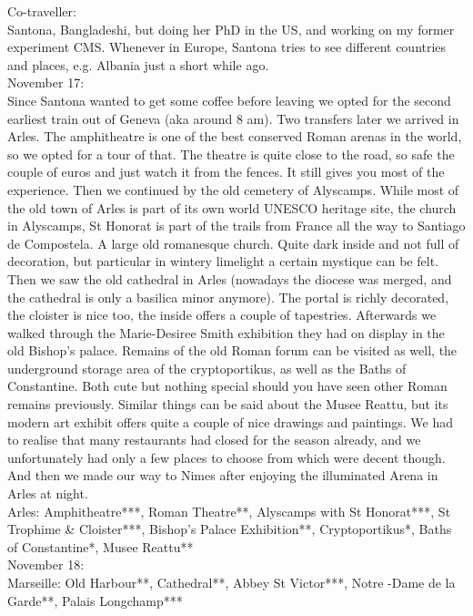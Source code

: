 Co-traveller:\\
Santona, Bangladeshi, but doing her PhD in the US, and working on my former experiment CMS. Whenever in Europe, Santona tries to see different countries and places,  e.g. Albania just a short while ago.\\

November 17:\\
Since Santona wanted to get some coffee before leaving we opted for the second earliest train out of Geneva (aka around 8 am). Two transfers later we arrived in Arles. The amphitheatre is one of the best conserved Roman arenas in the world, so we opted for a tour of that. The theatre is quite close to the road, so safe the couple of euros and just watch it from the fences. It still gives you most of the experience. Then we continued by the old cemetery of Alyscamps. While most of the old town of Arles is part of its own world UNESCO heritage site, the church in Alyscamps, St Honorat is part of the trails from France all the way to Santiago de Compostela. A large old romanesque church. Quite dark inside and not full of decoration, but particular in wintery limelight a certain mystique can be felt. Then we saw the old cathedral in Arles (nowadays the diocese was merged, and the cathedral is only a basilica minor anymore). The portal is richly decorated, the cloister is nice too, the inside offers a couple of tapestries. Afterwards we walked through the Marie-Desiree Smith exhibition they had on display in the old Bishop's palace. Remains of the old Roman forum can be visited as well, the underground storage area of the cryptoportikus, as well as the Baths of Constantine. Both cute but nothing special should you have seen other Roman remains previously. Similar things can be said about the Musee Reattu, but its modern art  exhibit offers quite a couple of nice drawings and paintings. We had to realise that many restaurants had closed for the season already, and we unfortunately had only a few places to choose from which were decent though. And then we made our way to Nimes after enjoying the illuminated Arena in Arles at night.\\ 

Arles: Amphitheatre***, Roman Theatre**, Alyscamps with St Honorat***, St Trophime \& Cloister***, Bishop's Palace Exhibition**, Cryptoportikus*, Baths of Constantine*, Musee Reattu**\\

November 18:\\
Marseille: Old Harbour**, Cathedral**, Abbey St Victor***, Notre -Dame de la Garde**, Palais Longchamp***\\


